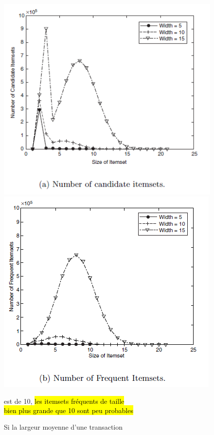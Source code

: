 \documentclass[letterpaper, 12pt]{article}
\begin{document}
			\begin{figure}[H]
				\centering
				\includegraphics[scale=0.75]{Images/freq_it_a}
				\includegraphics[scale=0.75]{Images/freq_it_b}
				\caption{Si la largeur moyenne d'une transaction}
						 est de 10, \hl{les itemsets fréquents de taille}\\
						 \hl{bien plus grande que 10 sont peu probables}
				\label{fig:freq_it:a}
			\end{figure}\noindent
\end{document}
